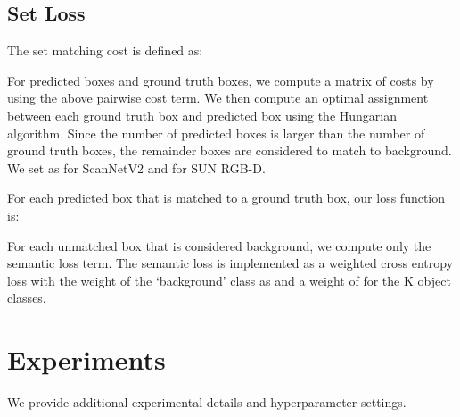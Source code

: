 \documentclass[10pt,twocolumn,letterpaper]{article}
\newcommand{\OURS}{3DETR\xspace}
\newcommand{\sunrgbd}{SUN RGB-D\xspace}
\newcommand{\scannet}{ScanNetV2\xspace}
\begin{document}
\begin{table}[!t]
    \centering
  \setlength{\tabcolsep}{0.3em}
\vspace{-0.1in}
\caption{\textbf{Inference Speed and Memory.}
We provide inference speed (in milliseconds) for different number of encoder and decoder layers in the \OURS model.
All timings are measured on a single V100 GPU with a batchsize of 8 and using 256 queries.
}
\label{tab:inference_speed}
\end{table}


\subsection{Set Loss}
The set matching cost is defined as:


For  predicted boxes and  ground truth boxes, we compute a  matrix of costs by using the above pairwise cost term.
We then compute an optimal assignment between each ground truth box and predicted box using the Hungarian algorithm.
Since the number of predicted boxes is larger than the number of ground truth boxes, the remainder  boxes are considered to match to background.
We set  as  for \scannet and  for \sunrgbd.


For each predicted box that is matched to a ground truth box, our loss function is:

For each unmatched box that is considered background, we compute only the semantic loss term.
The semantic loss is implemented as a weighted cross entropy loss with the weight of the `background' class as  and a weight of  for the K object classes.

\section{Experiments}
\label{sec:supp_experiments}
We provide additional experimental details and hyperparameter settings.
\end{document}
